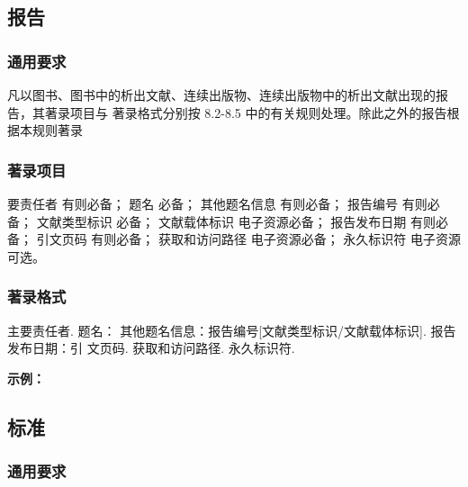 \documentclass{article}
\begin{document}
\subsection{报告}

\subsubsection{通用要求}

凡以图书、图书中的析出文献、连续出版物、连续出版物中的析出文献出现的报告，其著录项目与
著录格式分别按 8.2-8.5 中的有关规则处理。除此之外的报告根据本规则著录

\subsubsection{著录项目}

要责任者 有则必备；
题名 必备；
其他题名信息 有则必备；
报告编号 有则必备；
文献类型标识 必备；
文献载体标识 电子资源必备；
报告发布日期 有则必备；
引文页码 有则必备；
获取和访问路径 电子资源必备；
永久标识符 电子资源可选。

\subsubsection{著录格式}
主要责任者. 题名： 其他题名信息：报告编号[文献类型标识/文献载体标识]. 报告发布日期：引
文页码. 获取和访问路径. 永久标识符.


\begin{refsection}

\nocite{中国互联网络信息中心2012--}
\nocite{汤万金2013-09-30--,中国宏观2020蓝皮书,美国疾病2018黄皮书,中国信息2023白皮书}
\nocite{Calkin2011-8-9}
\nocite{DTFHA1990--}
\nocite{WHO1970--,UN2024DT}


\textbf{示例：}

{\printbibliography[heading=none,env=indentegenv]}
\end{refsection}


\subsection{标准}

\subsubsection{通用要求}
\end{document}
